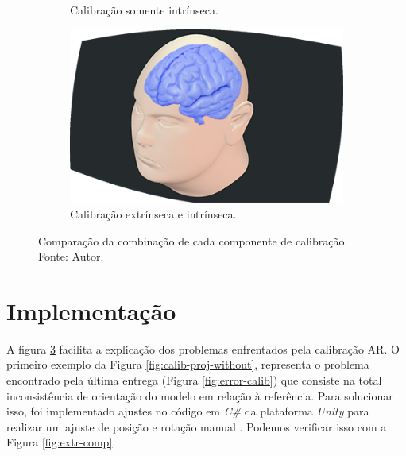 \begin{figure}[H]
\begin{subfigure}{.4\textwidth}
        \caption{Calibração somente intrínseca.}
        \label{fig:calib-proj-intr}
    \end{subfigure}
    \begin{subfigure}{.4\textwidth}
        \centering
        \includegraphics[width=.65\textwidth]{figuras/Calib.png}
        \caption{Calibração extrínseca e intrínseca.}
        \label{fig:calib-proj}
    \end{subfigure}
    \caption{Comparação da combinação de cada componente de calibração. Fonte: Autor.}
    \label{fig:calib-proj-comp}
\end{figure}

\section{Implementação}\label{chp:impl}

A figura \ref{fig:calib-proj-comp} facilita a explicação dos problemas enfrentados pela calibração AR. O primeiro exemplo da Figura \ref{fig:calib-proj-without}, representa o problema encontrado pela última entrega (Figura \ref{fig:error-calib}) que consiste na total inconsistência de orientação do modelo em relação à referência. Para solucionar isso, foi implementado ajustes no código em \textit{C\#} da plataforma \textit{Unity} para realizar um ajuste de posição e rotação manual \cite{UnityOficial}. Podemos verificar isso com a Figura \ref{fig:extr-comp}.

